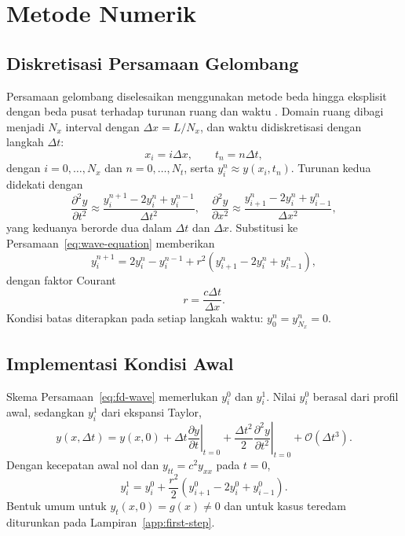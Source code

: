 \documentclass[aps,prl,twocolumn,superscriptaddress]{revtex4-2}
\begin{document}
\section{Metode Numerik}
\label{sec:metode-numerik}

    \subsection{Diskretisasi Persamaan Gelombang}

        Persamaan gelombang diselesaikan menggunakan metode beda hingga eksplisit dengan beda pusat terhadap turunan ruang dan waktu \cite{LeVeque2007}. 
        Domain ruang dibagi menjadi $N_x$ interval dengan $\Delta x=L/N_x$, dan waktu didiskretisasi dengan langkah $\Delta t$:
        \begin{equation}
            x_i=i\Delta x, \qquad t_n=n\Delta t,
        \end{equation}
        dengan $i=0,\ldots,N_x$ dan $n=0,\ldots,N_t$, serta $y_i^n\approx y(x_i,t_n)$.
        Turunan kedua didekati dengan
        \begin{equation}
            \frac{\partial^2 y}{\partial t^2} \approx \frac{y_i^{n+1}-2y_i^n+y_i^{n-1}}{\Delta t^2},
            \quad
            \frac{\partial^2 y}{\partial x^2} \approx \frac{y_{i+1}^n-2y_i^n+y_{i-1}^n}{\Delta x^2},
        \end{equation}
        yang keduanya berorde dua dalam $\Delta t$ dan $\Delta x$. 
        Substitusi ke Persamaan~\eqref{eq:wave-equation} memberikan
        \begin{equation}
            y_i^{n+1} = 2y_i^n-y_i^{n-1} +r^2 \left( y_{i+1}^n-2y_i^n+y_{i-1}^n \right),
            \label{eq:fd-wave}
        \end{equation}
        dengan faktor Courant
        \begin{equation}
            r=\frac{c\Delta t}{\Delta x}.
            \label{eq:courant}
        \end{equation}
        Kondisi batas diterapkan pada setiap langkah waktu: $y_0^n=y_{N_x}^n=0$.

    \subsection{Implementasi Kondisi Awal}

        Skema Persamaan~\eqref{eq:fd-wave} memerlukan $y_i^0$ dan $y_i^1$. 
        Nilai $y_i^0$ berasal dari profil awal, sedangkan $y_i^1$ dari ekspansi Taylor,
        \begin{equation}
            y(x,\Delta t) = y(x,0) + \Delta t \left.\frac{\partial y}{\partial t}\right|_{t=0} + \frac{\Delta t^2}{2} \left.\frac{\partial^2 y}{\partial t^2}\right|_{t=0} + \mathcal{O}(\Delta t^3).
        \end{equation}
        Dengan kecepatan awal nol dan $y_{tt}=c^2y_{xx}$ pada $t=0$,
        \begin{equation}
            y_i^1 = y_i^0+ \frac{r^2}{2} \left( y_{i+1}^0-2y_i^0+y_{i-1}^0 \right).
            \label{eq:first-time-step}
        \end{equation}
        Bentuk umum untuk $y_t(x,0)=g(x)\neq0$ dan untuk kasus teredam diturunkan pada Lampiran~\ref{app:first-step}.
\end{document}
